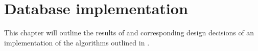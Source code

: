\chapter{Database implementation}\label{chap:database}
This chapter will outline the results of and corresponding design decisions
of an implementation of the algorithms outlined in
\cite{RelationalAlgebraByWayOfAdjunctions}.

